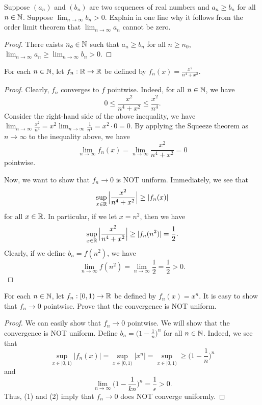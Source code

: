 \documentclass[a4paper]{article}
\begin{document}
\begin{problem}
   Suppose \( ({a}_{n})  \) and \( ({b}_{n})  \) are two sequences of real numbers and \( {a}_{n} \geq {b}_{n}  \) for all \( n \in \mathbb{N} \). Suppose \( \lim_{ n \to \infty  }  {b}_{n} > 0  \). Explain in one line why it follows from the order limit theorem that \( \lim_{ n \to \infty  }  {a}_{n} \) cannot be zero.
\end{problem}
\begin{proof}
There exists \( {n}_{o} \in \mathbb{N} \) such that \( {a}_{n} \geq {b}_{n} \) for all \( n \geq {n}_{0} \), \( \lim_{ n \to \infty  }  {a}_{n} \geq \lim_{ n \to \infty  }  {b}_{n} > 0 \).
\end{proof}

\begin{problem}[4-1]
    For each \( n \in \mathbb{N} \), let \( {f}_{n}: \mathbb{R} \to \mathbb{R}  \) be defined by \( {f}_{n}(x) = \frac{ x^{2} }{  n^{4} + x^{2} }  \).
\end{problem}
\begin{proof}
Clearly, \( {f}_{n}  \) converges to \( f  \) pointwise. Indeed, for all \( n \in \mathbb{N} \), we have 
\[  0 \leq \frac{ x^{2} }{  n^{4} + x^{2} }  \leq \frac{ x^{2} }{  n^{4} }. \]
Consider the right-hand side of the above inequality, we have 
    \( \lim_{ n \to \infty  }  \frac{ x^{2} }{ n^{4} }  = x^{2} \lim_{ n \to \infty  }  \frac{ 1 }{ n^{4} }  = x^{2} \cdot 0 = 0.  \)
    By applying the Squeeze theorem as \( n \to \infty  \) to the inequality above, we have 
    \[ \lim_{ n \to \infty  } {f}_{n}(x)  = \lim_{ n \to \infty  }  \frac{ x^{2} }{ n^{4} + x^{2} }  = 0    \]
    pointwise. 

    Now, we want to show that \( {f}_{n} \to 0  \) is NOT uniform. Immediately, we see that
    \[  \sup_{x \in \mathbb{R}} \Big| \frac{ x^{2} }{  n^{4} + x^{2} }  \Big| \geq | {f}_{n}(x) |  \] for all \( x \in \mathbb{R}  \).
    In particular, if we let \( x = n^{2} \), then we have
    \[  \sup_{x \in \mathbb{R} } \Big|  \frac{ x^{2}  }{  n^{4} + x^{2} }   \Big|  \geq | {f}_{n}(n^{2}) |  = \frac{ 1 }{ 2 }. \]
    Clearly, if we define \( {b}_{n} = f(n^{2}) \), we have 
    \[  \lim_{ n \to \infty  }  f(n^{2}) = \lim_{ n \to \infty  }  \frac{ 1 }{ 2 }  = \frac{ 1 }{ 2 }  > 0. \]
\end{proof}

\begin{problem}[4-2]
    For each \( n \in \mathbb{N} \), let \(  {f}_{n}: [0,1) \to \mathbb{R}  \) be defined by \( {f}_{n}(x) = x^{n} \). It is easy to show that \( {f}_{n} \to 0  \) pointwise. Prove that the convergence is NOT uniform.  
\end{problem}
\begin{proof}
We can easily show that \( {f}_{n} \to 0  \) pointwise. We will show that the convergence is NOT uniform. Define \( {b}_{n} = \Big(  1 - \frac{ 1 }{ n }  \Big)^{n} \) for all \( n \in \mathbb{N} \). Indeed, we see that 
\[  \sup_{x \in [0,1)} | {f}_{n}(x) |  = \sup_{x \in [0,1)} | x^{n} | = \sup_{x \in [0,1)} \geq \Big(  1 - \frac{ 1 }{ n }  \Big)^{n} \tag{1} \]
and
\[  \lim_{ n \to \infty  }  \Big(  1 - \frac{ 1 }{ kn }  \Big)^{n} = \frac{ 1 }{ \epsilon  }  > 0. \tag{2}  \]
Thus, (1) and (2) imply that \( {f}_{n} \to 0  \) does NOT converge uniformly.
\end{proof}
\end{document}
